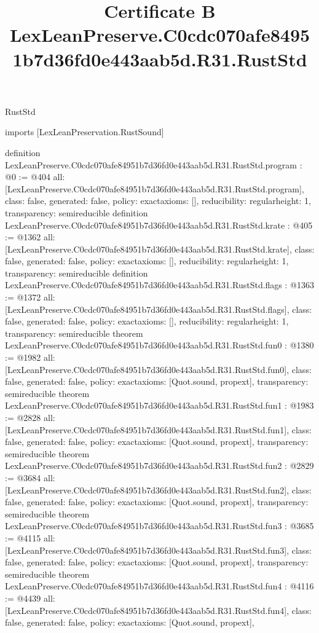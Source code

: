 \begin{lexlean}{RustStd}
\title{Certificate B LexLeanPreserve.C0cdc070afe84951b7d36fd0e443aab5d.R31.RustStd}
\begin{coremodule}
imports [LexLeanPreservation.RustSound]

definition LexLeanPreserve.C0cdc070afe84951b7d36fd0e443aab5d.R31.RustStd.program : @0 := @404 {
  all: [LexLeanPreserve.C0cdc070afe84951b7d36fd0e443aab5d.R31.RustStd.program],
  class: false,
  generated: false,
  policy: exact{axioms: []},
  reducibility: regular{height: 1},
  transparency: semireducible
}
definition LexLeanPreserve.C0cdc070afe84951b7d36fd0e443aab5d.R31.RustStd.krate : @405 := @1362 {
  all: [LexLeanPreserve.C0cdc070afe84951b7d36fd0e443aab5d.R31.RustStd.krate],
  class: false,
  generated: false,
  policy: exact{axioms: []},
  reducibility: regular{height: 1},
  transparency: semireducible
}
definition LexLeanPreserve.C0cdc070afe84951b7d36fd0e443aab5d.R31.RustStd.flags : @1363 := @1372 {
  all: [LexLeanPreserve.C0cdc070afe84951b7d36fd0e443aab5d.R31.RustStd.flags],
  class: false,
  generated: false,
  policy: exact{axioms: []},
  reducibility: regular{height: 1},
  transparency: semireducible
}
theorem LexLeanPreserve.C0cdc070afe84951b7d36fd0e443aab5d.R31.RustStd.fun0 : @1380 := @1982 {
  all: [LexLeanPreserve.C0cdc070afe84951b7d36fd0e443aab5d.R31.RustStd.fun0],
  class: false,
  generated: false,
  policy: exact{axioms: [Quot.sound, propext]},
  transparency: semireducible
}
theorem LexLeanPreserve.C0cdc070afe84951b7d36fd0e443aab5d.R31.RustStd.fun1 : @1983 := @2828 {
  all: [LexLeanPreserve.C0cdc070afe84951b7d36fd0e443aab5d.R31.RustStd.fun1],
  class: false,
  generated: false,
  policy: exact{axioms: [Quot.sound, propext]},
  transparency: semireducible
}
theorem LexLeanPreserve.C0cdc070afe84951b7d36fd0e443aab5d.R31.RustStd.fun2 : @2829 := @3684 {
  all: [LexLeanPreserve.C0cdc070afe84951b7d36fd0e443aab5d.R31.RustStd.fun2],
  class: false,
  generated: false,
  policy: exact{axioms: [Quot.sound, propext]},
  transparency: semireducible
}
theorem LexLeanPreserve.C0cdc070afe84951b7d36fd0e443aab5d.R31.RustStd.fun3 : @3685 := @4115 {
  all: [LexLeanPreserve.C0cdc070afe84951b7d36fd0e443aab5d.R31.RustStd.fun3],
  class: false,
  generated: false,
  policy: exact{axioms: [Quot.sound, propext]},
  transparency: semireducible
}
theorem LexLeanPreserve.C0cdc070afe84951b7d36fd0e443aab5d.R31.RustStd.fun4 : @4116 := @4439 {
  all: [LexLeanPreserve.C0cdc070afe84951b7d36fd0e443aab5d.R31.RustStd.fun4],
  class: false,
  generated: false,
  policy: exact{axioms: [Quot.sound, propext]},
}
\end{coremodule}
\end{lexlean}
